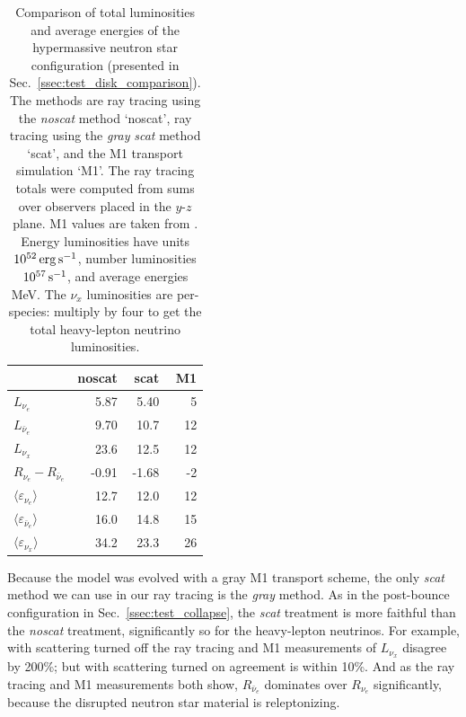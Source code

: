 \documentclass[aps,floatfix,prd,superscriptaddress,twocolumn]{revtex4-1}
\begin{document}
\begin{table}%
  \caption{
    Comparison of total luminosities and average energies
    of the hypermassive neutron star configuration
    (presented in Sec.~\ref{ssec:test_disk_comparison}).
    The methods are ray tracing using the \emph{noscat} method `noscat',
    ray tracing using the \emph{gray} \emph{scat} method `scat',
    and the M1 transport simulation `M1'.
    The ray tracing totals were computed from sums over
    observers placed in the $y$-$z$ plane.
    M1 values are taken from \cite[Figs. 7, 9, 10]{fouc2016-m1_evolve_n}.
    Energy luminosities have units $10^{52}\,{\rm erg}\,{\rm s}^{-1}$,
    number luminosities $10^{57}\,{\rm s}^{-1}$, and
    average energies MeV.
    The $\nu_x$ luminosities are per-species:
    multiply by four to get the total heavy-lepton neutrino luminosities.
  }
  \label{tab:nsns_rt_vs_m1}
  \begin{tabularx}{\columnwidth}{X r r r}
    & {\bf noscat} & \,\,{\bf scat} & \,\,{\bf M1} \\
    \hline
    $L_{\nu_e}$                                 & 5.87 & 5.40 & 5 \\
    $L_{\bar{\nu}_e}$                           & 9.70 & 10.7 & 12 \\
    $L_{\nu_x}$                                 & 23.6 & 12.5 & 12 \\
    $R_{\nu_e}-R_{\bar{\nu}_e}$                 & -0.91 & -1.68 & -2 \\
    $\langle \varepsilon_{\nu_e} \rangle$       & 12.7 & 12.0 & 12 \\
    $\langle \varepsilon_{\bar{\nu}_e} \rangle$ & 16.0 & 14.8 & 15 \\
    $\langle \varepsilon_{\nu_x} \rangle$       & 34.2 & 23.3 & 26 \\
    \hline
  \end{tabularx}
\end{table}

Because the model was evolved with a gray M1 transport scheme,
the only \emph{scat} method we can use in our ray tracing is the
\emph{gray} method.
As in the post-bounce configuration in Sec.~\ref{ssec:test_collapse},
the \emph{scat} treatment is more faithful than the \emph{noscat} treatment,
significantly so for the heavy-lepton neutrinos.
For example, with scattering turned off the ray tracing and M1 measurements
of $L_{\nu_x}$ disagree by 200\%;
but with scattering turned on agreement is within 10\%.
And as the ray tracing and M1 measurements both show,
$R_{\bar{\nu}_e}$ dominates over $R_{\nu_e}$ significantly,
because the disrupted neutron star material is releptonizing.
\end{document}
